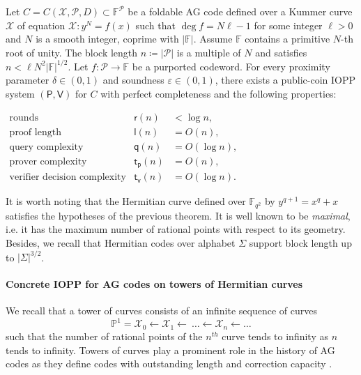 \documentclass[a4paper,USenglish,autoref]{lipics-v2021}
\renewcommand\epsilon{\varepsilon}
\newcommand\F{\mathbb{F}}
\newcommand\PP{\mathbb{P}}
\newcommand\prover{\mathsf{P}}
\newcommand\verifier{\mathsf{V}}
\newcommand{\size}[1]{\left|#1\right|}
\newcommand\calX{\mathcal{X}}
\newcommand\calP{\mathcal{P}}
\newcommand\mydef{\coloneqq}
\begin{document}
\begin{theorem}\label{thm:intro-kummer} Let ${C = C(\calX, \calP, D)} \subset \F^{\calP}$ be a foldable AG code defined over a Kummer curve $\calX$  of equation $\calX : y^N = f(x)$ such that $\deg f= N \ell -1$ for some integer $\ell >0$ and $N$ is a smooth integer, coprime with $\size{\F}$.    Assume $\F$ contains a primitive $N$-th root of unity. 
	The block length $n \mydef \size{\calP}$ is a multiple of $N$ and satisfies $n < \ell N^2\size{\F}^{1/2}$.
	Let $f : \calP \rightarrow \F$ be a purported codeword. For every proximity parameter $\delta \in (0, 1)$ and soundness $\epsilon \in (0,1)$, there exists a public-coin IOPP system $(\prover, \verifier)$ for $C$ with perfect completeness and the following properties:
	
	$
	\begin{array}{lll}
		\text{rounds} &\mathsf{r}(n) &< \log n,\\
		\text{proof length} &\mathsf{l}(n) &= O(n),\\
		\text{query complexity} &\mathsf{q}(n) &= O(\log n),\\
		\text{prover complexity} &\mathsf{t_p}(n) &= O(n),\\
		\text{verifier decision complexity} & \mathsf{t_v}(n) &= O(\log n).
	\end{array}
	$
\end{theorem}

It is worth noting that the Hermitian curve defined over $\F_{q^2}$ by $y^{q+1}=x^q+x$ satisfies the hypotheses of the previous theorem. It is well known to be \emph{maximal}, i.e. it has the maximum number of rational points with respect to its geometry. Besides, we recall that Hermitian codes over alphabet $\Sigma$ support block length up to $\size \Sigma^{3/2}$.

\paragraph*{Concrete IOPP for AG codes on towers of Hermitian curves}
We recall that a tower of curves consists of an infinite sequence of curves 
\[\PP^1 = \calX_0\gets\calX_1\gets\ \ldots\gets\calX_n\gets\ldots\]
such that the number of rational points of the $n^{th}$ curve tends to infinity as $n$ tends to infinity. Towers of curves play a prominent role in the history of AG codes as they define codes with outstanding length and correction capacity \cite{TVZ82,BBGS14}. 
\end{document}
